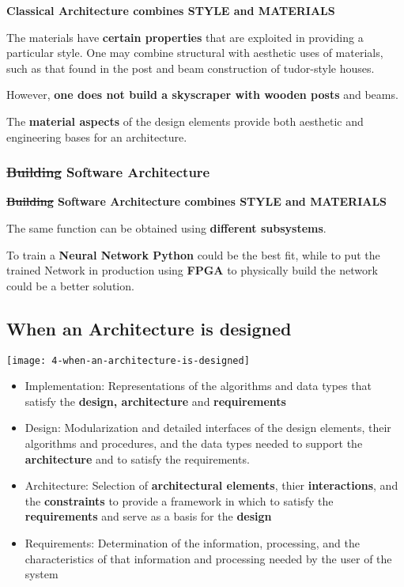 \textbf{Classical Architecture combines STYLE and MATERIALS}

The materials have \textbf{certain properties} that are exploited in providing a particular style. One may combine structural with aesthetic uses of materials, such as that found in the post and beam construction of tudor-style houses.

However, \textbf{one does not build a skyscraper with wooden posts} and beams.

The \textbf{material aspects} of the design elements provide both aesthetic and engineering bases for an architecture.

\subsubsection{\sout{Building} Software Architecture}

\textbf{\sout{Building} Software Architecture combines STYLE and MATERIALS}

The same function can be obtained using \textbf{different subsystems}.

To train a \textbf{Neural Network Python} could be the best fit, while to put the trained Network in production using \textbf{FPGA} to physically build the network could be a better solution.

\subsection{When an Architecture is designed}
\begin{center}
\texttt{[image: 4-when-an-architecture-is-designed]}
\end{center}

\begin{itemize}
	\item Implementation: Representations of the algorithms and data types that satisfy the \textbf{design, architecture} and \textbf{requirements}
	
	\item Design: Modularization and detailed interfaces of the design elements, their algorithms and procedures, and the data types needed to support the \textbf{architecture} and to satisfy the requirements.
	
	\item Architecture: Selection of \textbf{architectural elements}, thier \textbf{interactions}, and the \textbf{constraints} to provide a framework in which to satisfy the \textbf{requirements} and serve as a basis for the \textbf{design}
	
	\item Requirements: Determination of the information, processing, and the characteristics of that information and processing needed by the user of the system
\end{itemize}


